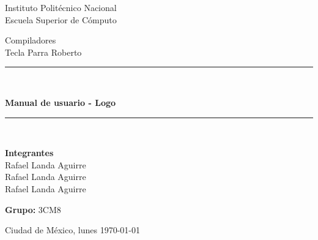 \begin{center}
	\vspace*{0.0in}
	\begin{large}
		Instituto Politécnico Nacional\\                %
		\vspace*{0.2in}
		Escuela Superior de Cómputo\\                   %
		\vspace*{0.6in}
		
	\end{large}
	\begin{large}
		Compiladores \\	                       			%
		\vspace*{0.2in}
		Tecla Parra Roberto\\                 			%
		\vspace*{0.8in}
		
	\end{large}
	\rule{150mm}{0.1mm}\\
	\vspace*{0.2in}
	\begin{Large}
		\textbf{Manual de usuario - Logo} \\     		%
        \vspace*{0.2in}
        
	\end{Large}
	\vspace*{0.2in}
	\rule{150mm}{0.1mm}\\
	\begin{large}
		\vspace*{0.3in}
		
		\textbf{Integrantes} \\
		Rafael Landa Aguirre\\
		Rafael Landa Aguirre\\
		Rafael Landa Aguirre\\
	\end{large}
	\begin{large}
		\vspace*{0.35in}
		\textbf{Grupo:} 3CM8 \\
		\vspace*{0.4in}
		
		Ciudad de México, lunes \today \\     %
	\end{large}
\end{center}